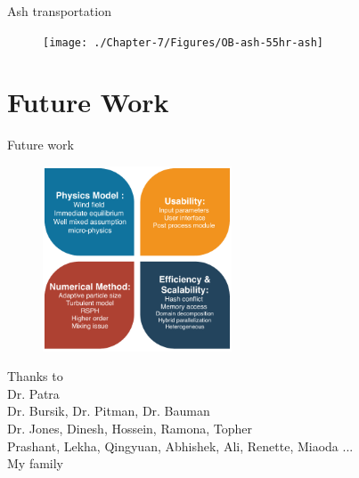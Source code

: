 \documentclass{beamer}
\begin{document}
\begin{frame}{Ash transportation}
\begin{figure}[!htb]
\begin{minipage}{.293\textwidth}
    \end{minipage}%
    \begin{minipage}{.293\textwidth}
        \centering
        \texttt{[image: ./Chapter-7/Figures/OB-ash-55hr-ash]}
    \end{minipage}%
\end{figure}
\end{frame}

\section{Future Work}
\begin{frame} {Future work}
\begin{figure}
	\includegraphics[width=0.5\textwidth]{./PPT/Future-Work}
\end{figure}
\end{frame}
%
\begin{frame}{}
\center
\huge{
Thanks to \\}
\Large
{
Dr. Patra \\
Dr. Bursik, Dr. Pitman, Dr. Bauman \\
Dr. Jones, Dinesh, Hossein, Ramona, Topher \\
Prashant, Lekha, Qingyuan, Abhishek, Ali, Renette, Miaoda ...\\
My family \\
}
\end{frame}
\end{document}
